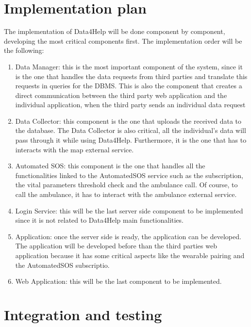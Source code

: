 \chapter{Implementation plan}
The implementation of Data4Help will be done component by component, developing the most critical components first.
The implementation order will be the following:
\begin{enumerate}
\item Data Manager: this is the most important component of the system, since it is the one that handles the data requests from third parties and translate this requests in queries for the DBMS. 
This is also the component that creates a direct communication between the third party web application and the individual application, when the third party sends an individual data request
\item Data Collector: this component is the one that uploads the received data to the database. The Data Collector is also critical, all the individual's data will pass through it while using Data4Help. Furthermore, it is the one that has to interacts with the map external service.
\item Automated SOS: this component is the one that handles all the functionalities linked to the AutomatedSOS service such as the subscription, the vital parameters threshold check and the ambulance call. Of course, to call the ambulance, it has to interact with the ambulance external service.
\item Login Service: this will be the last server side component to be implemented since it is not related to Data4Help main functionalities.
\item Application: once the server side is ready, the application can be developed. The application will be developed before than the third parties web application because it has some critical aspects like the wearable pairing and the AutomatedSOS subscriptio.
\item Web Application: this will be the last component to be implemented.
\end{enumerate}

\chapter{Integration and testing} 
